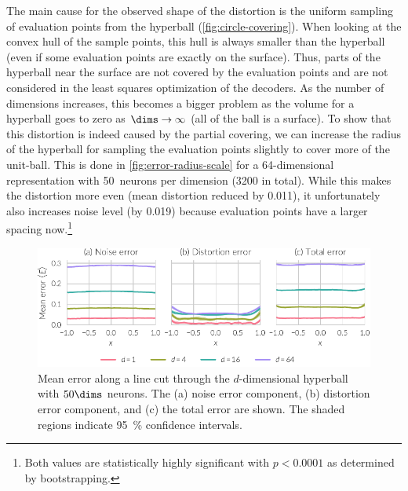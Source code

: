 The main cause for the observed shape of the distortion is the uniform sampling of evaluation points from the hyperball (\cref{fig:circle-covering}).
When looking at the convex hull of the sample points, this hull is always smaller than the hyperball (even if some evaluation points are exactly on the surface).
Thus, parts of the hyperball near the surface are not covered by the evaluation points and are not considered in the least squares optimization of the decoders.
As the number of dimensions increases, this becomes a bigger problem as the volume for a hyperball goes to zero as $\dims \rightarrow \infty$ (all of the ball is a surface).
To show that this distortion is indeed caused by the partial covering, we can increase the radius of the hyperball for sampling the evaluation points slightly to cover more of the unit-ball.
This is done in \cref{fig:error-radius-scale} for a 64-dimensional representation with \num{50}~neurons per dimension (\num{3200} in total).
While this makes the distortion more even (mean distortion reduced by \num{0.011}), it unfortunately also increases noise level (by \num{0.019}) because evaluation points have a larger spacing now.\footnote{Both values are statistically highly significant with $p < 0.0001$ as determined by bootstrapping.}
\begin{figure}
    \centering
    \includegraphics{figures/error-linecut}
    \caption[Mean error along line cut through hyperball]{Mean error along a line cut through the $d$-dimensional hyperball with $50\dims$ neurons. The (a) noise error component, (b) distortion error component, and (c) the total error are shown. The shaded regions indicate \SI{95}{\percent} confidence intervals.}\label{fig:error-linecut}
\end{figure}
